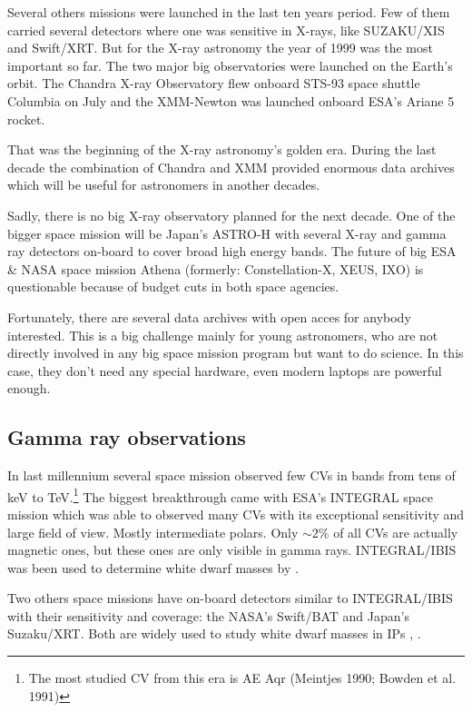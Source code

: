\documentclass[oneside,a4paper,11pt]{report}
\begin{document}
Several others missions were launched in the last ten years period. Few of them carried several 
detectors where one was sensitive in X-rays, like SUZAKU/XIS and Swift/XRT. But for the X-ray 
astronomy the year of 1999 was the most important so far. The two major big observatories 
were launched on the Earth's orbit. The Chandra X-ray Observatory flew onboard STS-93 space shuttle 
Columbia on July and the XMM-Newton was launched onboard ESA's Ariane 5 rocket.

   That was the beginning of the X-ray astronomy's golden era. During the last decade the combination of 
Chandra and XMM provided enormous data archives which will be useful for astronomers in another 
decades. 

Sadly, there is no big X-ray observatory planned for the next decade. One of the bigger space 
mission will be Japan's ASTRO-H with several X-ray and gamma ray detectors on-board to cover broad 
high energy bands. The future of big ESA \& NASA space mission Athena (formerly: Constellation-X, 
XEUS, IXO)  is questionable because of budget cuts in both space agencies. 

Fortunately, there are several data archives with open acces for anybody 
interested. This is a big challenge mainly for young astronomers, who are 
not directly involved in any big space mission program but want to do science. In this case, 
they don't need any special hardware, even modern laptops are powerful enough.     



    
\subsection{Gamma ray observations}
In last millennium several space mission observed few CVs in bands from tens of keV to TeV.\footnote{The most 
studied CV from this era is AE Aqr (Meintjes 1990; Bowden et al. 1991)}
The biggest breakthrough came with ESA's INTEGRAL space mission which was able to observed many CVs with its
exceptional sensitivity and large field of view. Mostly intermediate polars. Only $\sim 2\%$ 
of all CVs are actually magnetic ones, but these ones are only visible in gamma rays.
INTEGRAL/IBIS was been used to determine white dwarf masses by \citet{2009MNRAS.392..630L}.

Two others space missions have on-board detectors similar to INTEGRAL/IBIS with their sensitivity 
and coverage: the NASA's Swift/BAT and Japan's Suzaku/XRT. Both are widely used to study white dwarf 
masses in IPs \citet{2009A&A...496..121B}, \citet{2010A&A...520A..25Y}.    
\end{document}
